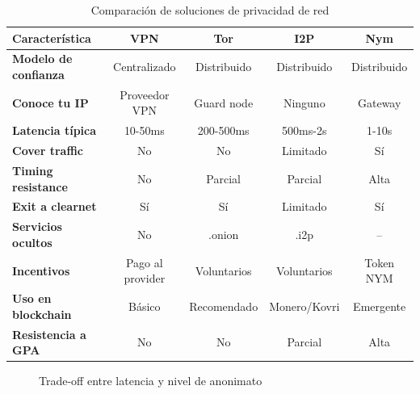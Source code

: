 \documentclass[11pt,a4paper,twoside]{book}
\theoremstyle{definition}
\theoremstyle{remark}
\begin{document}
\begin{table}[htbp]
\centering
\footnotesize
\begin{tabular}{lcccc}
\toprule
\textbf{Característica} & \textbf{VPN} & \textbf{Tor} & \textbf{I2P} & \textbf{Nym} \\
\midrule
\textbf{Modelo de confianza} & Centralizado & Distribuido & Distribuido & Distribuido \\
\textbf{Conoce tu IP} & Proveedor VPN & Guard node & Ninguno & Gateway \\
\textbf{Latencia típica} & 10-50ms & 200-500ms & 500ms-2s & 1-10s \\
\textbf{Cover traffic} & No & No & Limitado & Sí \\
\textbf{Timing resistance} & No & Parcial & Parcial & Alta \\
\textbf{Exit a clearnet} & Sí & Sí & Limitado & Sí \\
\textbf{Servicios ocultos} & No & .onion & .i2p & -- \\
\textbf{Incentivos} & Pago al provider & Voluntarios & Voluntarios & Token NYM \\
\textbf{Uso en blockchain} & Básico & Recomendado & Monero/Kovri & Emergente \\
\textbf{Resistencia a GPA} & No & No & Parcial & Alta \\
\bottomrule
\end{tabular}
\caption{Comparación de soluciones de privacidad de red}
\end{table}

\begin{figure}[htbp]
\centering
{}
\caption{Trade-off entre latencia y nivel de anonimato}
\label{fig:privacy-tradeoff}
\end{figure}
\end{document}
